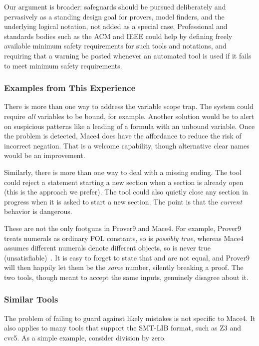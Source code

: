 Our argument is broader: safeguards should be pursued deliberately and pervasively as a standing design goal for provers, model finders, and the underlying logical notation, not added as a special case. Professional and standards bodies such as the ACM and IEEE could help by defining freely available minimum safety requirements for such tools and notations, and requiring that a warning be posted whenever an automated tool is used if it fails to meet minimum safety requirements.

\subsubsection{Examples from This Experience}

There is more than one way to address the variable scope trap. The system could require \emph{all} variables to be bound, for example. Another solution would be to alert on suspicious patterns like a leading \code{-} of a formula with an unbound variable. Once the problem is detected, Mace4 does have the affordance  to reduce the risk of incorrect negation. That is a welcome capability, though alternative clear names would be an improvement.

Similarly, there is more than one way to deal with a missing ending. The tool could reject a statement starting a new section when a section is already open (this is the approach we prefer). The tool could also quietly close any section in progress when it is asked to start a new section. The point is that the \emph{current} behavior is dangerous.

These are not the only footguns in Prover9 and Mace4. For example, Prover9 treats numerals as ordinary FOL constants, so  is \emph{possibly true}, whereas Mace4 assumes different numerals denote different objects, so  is never true (unsatisfiable)~\cite{mccune2009mace4input}. It is easy to forget to state that  and  are not equal, and Prover9 will then happily let them be the \emph{same} number, silently breaking a proof. The two tools, though meant to accept the same inputs, genuinely disagree about it.

\subsubsection{Similar Tools}

The problem of failing to guard against likely mistakes is not specific to Mace4. It also applies to many tools that support the SMT-LIB format, such as Z3 and cvc5. As a simple example, consider division by zero.

